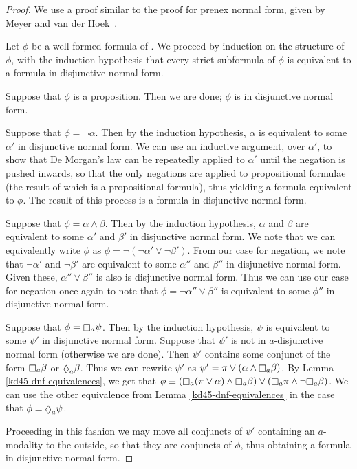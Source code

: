 \begin{proof}
We use a proof similar to the proof for prenex normal form, given by Meyer and
van der Hoek~\cite{meyer2004epistemic}.

Let $\phi$ be a well-formed formula of \logicKD{}. We proceed by induction on
the structure of $\phi$, with the induction hypothesis that every strict
subformula of $\phi$ is equivalent to a formula in disjunctive normal form.

Suppose that $\phi$ is a proposition. Then we are done; $\phi$ is in disjunctive
normal form.

Suppose that $\phi = \neg \alpha$. Then by the induction hypothesis, $\alpha$ is
equivalent to some $\alpha'$ in disjunctive normal form. We can use an inductive
argument, over $\alpha'$, to show that De Morgan's law can be repeatedly applied
to $\alpha'$ until the negation is pushed inwards, so that the only negations
are applied to propositional formulae (the result of which is a propositional
formula), thus yielding a formula equivalent to $\phi$. The result of this
process is a formula in disjunctive normal form. %

Suppose that $\phi = \alpha \land \beta$. Then by the induction hypothesis, $\alpha$
and $\beta$ are equivalent to some $\alpha'$ and $\beta'$ in disjunctive normal
form. We note that we can equivalently write $\phi$ as $\phi = \neg (\neg
\alpha' \lor \neg \beta')$. From our case for negation, we note that $\neg
\alpha'$ and $\neg \beta'$ are equivalent to some $\alpha''$ and $\beta''$ in
disjunctive normal form. Given these, $\alpha'' \lor \beta''$ is also is
disjunctive normal form. Thus we can use our case for negation once again to
note that $\phi = \neg \alpha'' \lor \beta''$ is equivalent to some $\phi''$ in
disjunctive normal form.

Suppose that $\phi = \knows_a \psi$. Then by the induction hypothesis, $\psi$ is
equivalent to some $\psi'$ in disjunctive normal form. Suppose that $\psi'$ is
not in $a$-disjunctive normal form (otherwise we are done). Then $\psi'$
contains some conjunct of the form $\knows_a \beta$ or $\suspects_a \beta$. Thus
we can rewrite $\psi'$ as $\psi' = \pi \lor (\alpha \land \knows_a \beta)$. By
Lemma \ref{kd45-dnf-equivalences}, we get that $\phi \equiv (\knows_a (\pi \lor
\alpha) \land \knows_a \beta) \lor (\knows_a \pi \land \neg \knows_a \beta)$. We
can use the other equivalence from Lemma \ref{kd45-dnf-equivalences} in the case
that $\phi = \suspects_a \psi$.

Proceeding in this fashion we may move all conjuncts of $\psi'$ containing an
$a$-modality to the outside, so that they are conjuncts of $\phi$, thus
obtaining a formula in disjunctive normal form. %
\end{proof}

